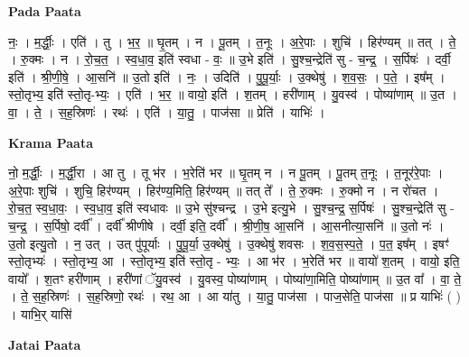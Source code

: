 \documentclass[17pt]{extarticle}
\begin{document}
\textbf{Pada Paata} \newline

नः॒ । म॒र्द्धीः॒ । एति॑ । तु । भ॒र॒ ॥ घृ॒तम् । न । पू॒तम् । त॒नूः । अ॒रे॒पाः । शुचि॑ । हिर॑ण्यम् ॥ तत् । ते॒ । रु॒क्मः । न । रो॒च॒त॒ । स्व॒धा॒व॒ इति॑ स्वधा - वः॒ ॥ उ॒भे इति॑ । सु॒श्च॒न्द्रेति॑ सु - च॒न्द्र॒ । स॒र्पिषः॑ । दर्वी॒ इति॑ । श्री॒णी॒षे॒ । आ॒सनि॑ ॥ उ॒तो इति॑ । नः॒ । उदिति॑ । पु॒पू॒र्याः॒ । उ॒क्थेषु॑ । श॒व॒सः॒ । प॒ते॒ । इष᳚म् । स्तो॒तृभ्य॒ इति॑ स्तो॒तृ-भ्यः॒ । एति॑ । भ॒र॒ ॥ वायो॒ इति॑ । श॒तम् । हरी॑णाम् । यु॒वस्व॑ । पोष्या॑णाम् ॥ उ॒त । वा॒ । ते॒ । स॒ह॒स्रिणः॑ । रथः॑ । एति॑ । या॒तु॒ । पाज॑सा ॥ प्रेति॑ । याभिः॑ ।  \newline


\textbf{Krama Paata} \newline

नो॒ म॒र्द्धीः॒ । म॒र्द्धी॒रा । आ तु । तू भ॑र । भ॒रेति॑ भर ॥ घृ॒तम् न । न पू॒तम् । पू॒तम् त॒नूः । त॒नूर॑रे॒पाः । अ॒रे॒पाः शुचि॑ । शुचि॒ हिर॑ण्यम् । हिर॑ण्य॒मिति॒ हिर॑ण्यम् ॥ तत् ते᳚ । ते॒ रु॒क्मः । रु॒क्मो न । न रो॑चत । रो॒च॒त॒ स्व॒धा॒वः॒ । स्व॒धा॒व॒ इति॑ स्वधावः ॥ उ॒भे सु॑श्चन्द्र । उ॒भे इत्यु॒भे । सु॒श्च॒न्द्र॒ स॒र्पिषः॑ । सु॒श्च॒न्द्रेति॑ सु - च॒न्द्र॒ । स॒र्पिषो॒ दर्वी᳚ । दर्वी᳚ श्रीणीषे । दर्वी॒ इति॒ दर्वी᳚ । श्री॒णी॒ष॒ आ॒सनि॑ । आ॒सनीत्या॒सनि॑ ॥ 
उ॒तो नः॑ । उ॒तो इत्यु॒तो । न॒ उत् । उत् पु॑पूर्याः । पु॒पू॒र्या॒ उ॒क्थेषु॑ । उ॒क्थेषु॑ शवसः । श॒व॒स॒स्प॒ते॒ । प॒त॒ इष᳚म् । इषꣳ॑ स्तो॒तृभ्यः॑ । स्तो॒तृभ्य॒ आ । स्तो॒तृभ्य॒ इति॑ स्तो॒तृ - भ्यः॒ । आ भ॑र । भ॒रेति॑ भर ॥ वायो॑ श॒तम् । वायो॒ इति॒ वायो᳚ । श॒तꣳ हरी॑णाम् । हरी॑णां ॅयु॒वस्व॑ । यु॒वस्व॒ पोष्या॑णाम् । पोष्या॑णा॒मिति॒ पोष्या॑णाम् ॥ उ॒त वा᳚ । वा॒ ते॒ । ते॒ स॒ह॒स्रिणः॑ । स॒ह॒स्रिणो॒ रथः॑ । रथ॒ आ । आ या॑तु । या॒तु॒ पाज॑सा । पाज॒सेति॒ पाज॑सा ॥ प्र याभिः॑ ( ) । याभि॒र् यासि॑ \newline

\textbf{Jatai Paata} \newline
\end{document}
